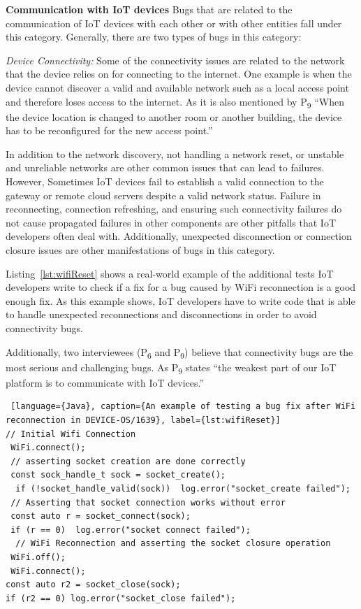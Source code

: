\textbf{Communication with IoT devices}
Bugs that are related to the communication of IoT devices with each other or with other entities fall under this category. Generally, there are two types of bugs in this category:

\textit{Device Connectivity:} 
Some of the connectivity issues are related to the network that the device relies on for connecting to the internet. One example is when the device cannot discover a valid and available network such as a local access point and therefore loses access to the internet. As it is also mentioned by P\textsubscript{9} \enquote{When the device location is changed to another room or another building, the device has to be reconfigured for the new access point.}
 
In addition to the network discovery, not handling a network reset, or unstable and unreliable networks are other common issues that can lead to failures. However, Sometimes IoT devices fail to establish a valid connection to the gateway or remote cloud servers despite a valid network status. Failure in reconnecting, connection refreshing, and ensuring such connectivity failures do not cause propagated failures in other components are other pitfalls that IoT developers often deal with. Additionally, unexpected disconnection or connection closure issues are other manifestations of bugs in this category.

Listing~\autoref{lst:wifiReset} shows a real-world example of the additional tests IoT developers write to check if a fix for a bug caused by WiFi reconnection is a good enough fix. As this example shows, IoT developers have to write code that is able to handle unexpected reconnections and disconnections in order to avoid connectivity bugs.

Additionally, two interviewees (P\textsubscript{6} and P\textsubscript{9}) believe that connectivity bugs are the most serious and challenging bugs. As P\textsubscript{9} states \enquote{the weakest part of our IoT platform is to communicate with IoT devices.}

\begin{lstlisting} [language={Java}, caption={An example of testing a bug fix after WiFi reconnection in DEVICE-OS/1639}, label={lst:wifiReset}] 
// Initial Wifi Connection
 WiFi.connect();
 // asserting socket creation are done correctly
 const sock_handle_t sock = socket_create();
  if (!socket_handle_valid(sock))  log.error("socket_create failed");
 // Asserting that socket connection works without error
 const auto r = socket_connect(sock);
 if (r == 0)  log.error("socket connect failed");
  // WiFi Reconnection and asserting the socket closure operation
 WiFi.off();
 WiFi.connect();
const auto r2 = socket_close(sock);
if (r2 == 0) log.error("socket_close failed");
\end{lstlisting}

